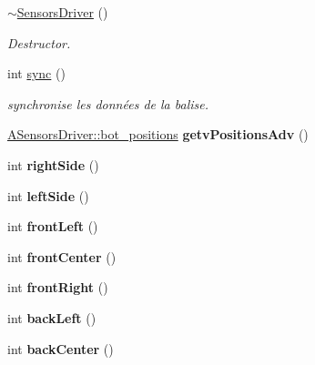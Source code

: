 \begin{DoxyCompactItemize}
\hyperlink{classSensorsDriver_aeb5bb8554d3bacd1cc267eedc2a8fb4d}{$\sim$\+Sensors\+Driver} ()
\begin{DoxyCompactList}\small\item\em Destructor. \end{DoxyCompactList}\item 
int \hyperlink{classSensorsDriver_a1bfbcc82461257094ed185fa2017afad}{sync} ()
\begin{DoxyCompactList}\small\item\em synchronise les données de la balise. \end{DoxyCompactList}\item 
\mbox{\label{classSensorsDriver_ac2b9d1fbaae6cbf09547f2a2d2e41af9}} 
\hyperlink{classASensorsDriver_a9743a29ef7d4faebd915f096f07bf729}{A\+Sensors\+Driver\+::bot\+\_\+positions} {\bfseries getv\+Positions\+Adv} ()
\item 
\mbox{\label{classSensorsDriver_ac1c1e82e2e28051147677faf1b002d0a}} 
int {\bfseries right\+Side} ()
\item 
\mbox{\label{classSensorsDriver_af30421d64581a0094f2762cf506032d9}} 
int {\bfseries left\+Side} ()
\item 
\mbox{\label{classSensorsDriver_ad9f2ff84de03a165c10848f8d9f21930}} 
int {\bfseries front\+Left} ()
\item 
\mbox{\label{classSensorsDriver_a3378e277cfb43319eb7b59b9b3fe3d12}} 
int {\bfseries front\+Center} ()
\item 
\mbox{\label{classSensorsDriver_a42e9d37f155cadf71e325bed5f46741e}} 
int {\bfseries front\+Right} ()
\item 
\mbox{\label{classSensorsDriver_ae0b9ea28342e6b59bbb2f9bfe187e839}} 
int {\bfseries back\+Left} ()
\item 
\mbox{\label{classSensorsDriver_ab2f96ed01fb916197ffb8906a6796c97}} 
int {\bfseries back\+Center} ()
\item 
\mbox{\label{classSensorsDriver_a4469035aacbc45c754dd3ae5e23275b3}} 

\end{DoxyCompactItemize}

